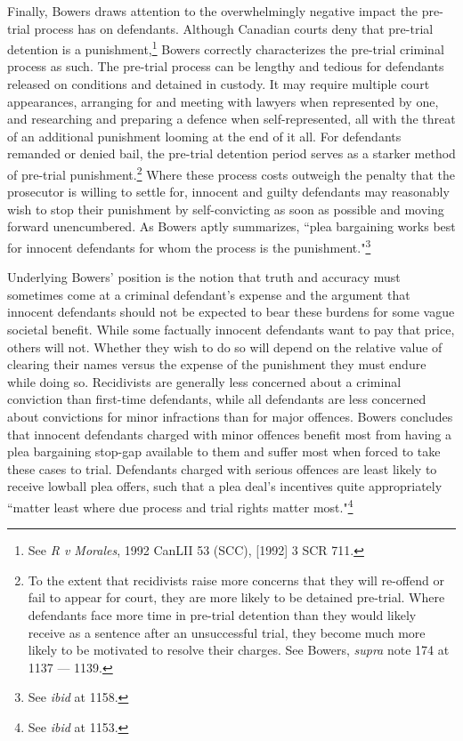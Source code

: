 Finally, Bowers draws attention to the overwhelmingly negative impact the pre-trial process has on defendants. Although Canadian courts deny that pre-trial detention is a punishment,\footnote{See \textit{R v Morales}, 1992 CanLII 53 (SCC), [1992] 3 SCR 711.} Bowers correctly characterizes the pre-trial criminal process as such. The pre-trial process can be lengthy and tedious for defendants released on conditions and detained in custody. It may require multiple court appearances, arranging for and meeting with lawyers when represented by one, and researching and preparing a defence when self-represented, all with the threat of an additional punishment looming at the end of it all. For defendants remanded or denied bail, the pre-trial detention period serves as a starker method of pre-trial punishment.\footnote{To the extent that recidivists raise more concerns that they will re-offend or fail to appear for court, they are more likely to be detained pre-trial. Where defendants face more time in pre-trial detention than they would likely receive as a sentence after an unsuccessful trial, they become much more likely to be motivated to resolve their charges. See Bowers, \textit{supra} note 174 at 1137 — 1139.} Where these process costs outweigh the penalty that the prosecutor is willing to settle for, innocent and guilty defendants may reasonably wish to stop their punishment by self-convicting as soon as possible and moving forward unencumbered. As Bowers aptly summarizes, ``plea bargaining works best for innocent defendants for whom the process is the punishment."\footnote{See \textit{ibid} at 1158.}

Underlying Bowers' position is the notion that truth and accuracy must sometimes come at a criminal defendant's expense and the argument that innocent defendants should not be expected to bear these burdens for some vague societal benefit. While some factually innocent defendants want to pay that price, others will not. Whether they wish to do so will depend on the relative value of clearing their names versus the expense of the punishment they must endure while doing so. Recidivists are generally less concerned about a criminal conviction than first-time defendants, while all defendants are less concerned about convictions for minor infractions than for major offences. Bowers concludes that innocent defendants charged with minor offences benefit most from having a plea bargaining stop-gap available to them and suffer most when forced to take these cases to trial. Defendants charged with serious offences are least likely to receive lowball plea offers, such that a plea deal's incentives quite appropriately ``matter least where due process and trial rights matter most."\footnote{See \textit{ibid} at 1153.} 


